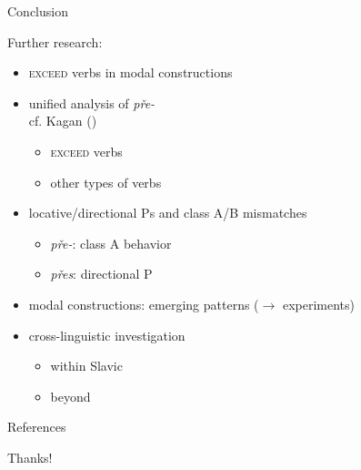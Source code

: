 \documentclass[12pt]{beamer}
\begin{document}
	\begin{frame}{Conclusion}
		
		Further research:
		
		\begin{itemize}
			\item \textsc{exceed} verbs in modal constructions
			\item unified analysis of \textit{pře-}\\
            \scriptsize cf. Kagan (\citeyear{kagan2013scalarity})\normalsize
			\begin{itemize}
				\item \textsc{exceed} verbs
				\item other types of verbs
			\end{itemize}            
            \item locative/directional Ps and class A/B mismatches
			\begin{itemize}
				\item \textit{pře-}: class A behavior
				\item \textit{přes}: directional P
			\end{itemize}
			\item modal constructions: emerging patterns ($\rightarrow$ experiments)
			\item cross-linguistic investigation
			\begin{itemize}
				\item within Slavic
				\item beyond
			\end{itemize}
		\end{itemize}
		
	\end{frame}
	
	\begin{frame}[t,allowframebreaks]{References}
		


\end{frame}

	\begin{frame}
    
		\begin{center}
			{\Huge Thanks!}
		\end{center}
		
	\end{frame}
		
\end{document}
